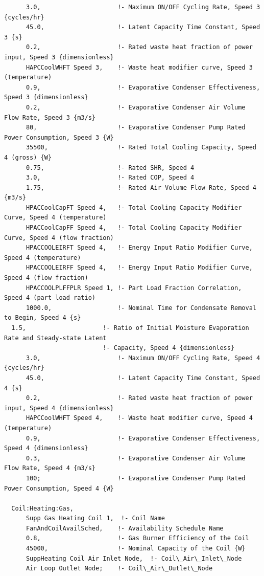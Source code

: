 \begin{lstlisting}
      3.0,                     !- Maximum ON/OFF Cycling Rate, Speed 3 {cycles/hr}
      45.0,                    !- Latent Capacity Time Constant, Speed 3 {s}
      0.2,                     !- Rated waste heat fraction of power input, Speed 3 {dimensionless}
      HAPCCoolWHFT Speed 3,    !- Waste heat modifier curve, Speed 3 (temperature)
      0.9,                     !- Evaporative Condenser Effectiveness, Speed 3 {dimensionless}
      0.2,                     !- Evaporative Condenser Air Volume Flow Rate, Speed 3 {m3/s}
      80,                      !- Evaporative Condenser Pump Rated Power Consumption, Speed 3 {W}
      35500,                   !- Rated Total Cooling Capacity, Speed 4 (gross) {W}
      0.75,                    !- Rated SHR, Speed 4
      3.0,                     !- Rated COP, Speed 4
      1.75,                    !- Rated Air Volume Flow Rate, Speed 4 {m3/s}
      HPACCoolCapFT Speed 4,   !- Total Cooling Capacity Modifier Curve, Speed 4 (temperature)
      HPACCoolCapFF Speed 4,   !- Total Cooling Capacity Modifier Curve, Speed 4 (flow fraction)
      HPACCOOLEIRFT Speed 4,   !- Energy Input Ratio Modifier Curve, Speed 4 (temperature)
      HPACCOOLEIRFF Speed 4,   !- Energy Input Ratio Modifier Curve, Speed 4 (flow fraction)
      HPACCOOLPLFFPLR Speed 1, !- Part Load Fraction Correlation, Speed 4 (part load ratio)
      1000.0,                  !- Nominal Time for Condensate Removal to Begin, Speed 4 {s}
  1.5,                     !- Ratio of Initial Moisture Evaporation Rate and Steady-state Latent
                           !- Capacity, Speed 4 {dimensionless}
      3.0,                     !- Maximum ON/OFF Cycling Rate, Speed 4 {cycles/hr}
      45.0,                    !- Latent Capacity Time Constant, Speed 4 {s}
      0.2,                     !- Rated waste heat fraction of power input, Speed 4 {dimensionless}
      HAPCCoolWHFT Speed 4,    !- Waste heat modifier curve, Speed 4 (temperature)
      0.9,                     !- Evaporative Condenser Effectiveness, Speed 4 {dimensionless}
      0.3,                     !- Evaporative Condenser Air Volume Flow Rate, Speed 4 {m3/s}
      100;                     !- Evaporative Condenser Pump Rated Power Consumption, Speed 4 {W}

  Coil:Heating:Gas,
      Supp Gas Heating Coil 1,  !- Coil Name
      FanAndCoilAvailSched,    !- Availability Schedule Name
      0.8,                     !- Gas Burner Efficiency of the Coil
      45000,                   !- Nominal Capacity of the Coil {W}
      SuppHeating Coil Air Inlet Node,  !- Coil\_Air\_Inlet\_Node
      Air Loop Outlet Node;    !- Coil\_Air\_Outlet\_Node


\end{lstlisting}
